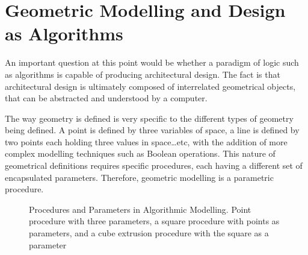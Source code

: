 \section{Geometric Modelling and Design as Algorithms}

An important question at this point would be whether a paradigm of logic such as algorithms is capable of producing architectural design. The fact is that architectural design is ultimately composed of interrelated geometrical objects, that can be abstracted and understood by a computer.

The way geometry is defined is very specific to the different types of geometry being defined. A point is defined by three variables of space, a line is defined by two points each holding three values in space\ldots etc, with the addition of more complex modelling techniques such as Boolean operations. This nature of geometrical definitions requires specific procedures, each having a different set of encapsulated parameters. Therefore, geometric modelling is a parametric procedure. \cite{hernandez06}

\begin{figure}[htbp]
\flushleft
{}
\centering
\vspace{5mm}
\caption[Procedures and Parameters in Algorithmic Modelling]{Procedures and Parameters in Algorithmic Modelling. {\footnotesize Point procedure with three parameters, a square procedure with points as parameters, and a cube extrusion procedure with the square as a parameter}}
\label{SqrAnalysis}
\end{figure}

